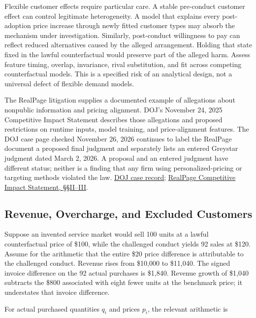 Flexible customer effects require particular care. A stable pre-conduct
customer effect can control legitimate heterogeneity. A model that
explains every post-adoption price increase through newly fitted
customer types may absorb the mechanism under investigation. Similarly,
post-conduct willingness to pay can reflect reduced alternatives caused
by the alleged arrangement. Holding that state fixed in the lawful
counterfactual would preserve part of the alleged harm. Assess feature
timing, overlap, invariance, rival substitution, and fit across
competing counterfactual models. This is a specified risk of an
analytical design, not a universal defect of flexible demand models.

The RealPage litigation supplies a documented example of allegations
about nonpublic information and pricing alignment. DOJ's November 24,
2025 Competitive Impact Statement describes those allegations and
proposed restrictions on runtime inputs, model training, and
price-alignment features. The DOJ case page checked November 26, 2026
continues to label the RealPage document a proposed final judgment and
separately lists an entered Greystar judgment dated March 2, 2026. A
proposal and an entered judgment have different status; neither is a
finding that any firm using personalized-pricing or targeting methods
violated the law.
\href{https://www.justice.gov/atr/case/us-and-plaintiff-states-v-realpage-inc}{DOJ
case record};
\href{https://www.justice.gov/atr/media/1419471/dl?inline=}{RealPage
Competitive Impact Statement, §§II--III}.

\hypertarget{M09-revenue-overcharge-and-excluded-customers}{%
\subsection{Revenue, Overcharge, and Excluded
Customers}\label{M09-revenue-overcharge-and-excluded-customers}}

\noindent \noindent Suppose an invented service market would sell 100 units at a
lawful counterfactual price of \$100, while the challenged conduct
yields 92 sales at \$120. Assume for the arithmetic that the entire \$20
price difference is attributable to the challenged conduct. Revenue
rises from \$10,000 to \$11,040. The signed invoice difference on the 92
actual purchases is \$1,840. Revenue growth of \$1,040 subtracts the
\$800 associated with eight fewer units at the benchmark price; it
understates that invoice difference.

For actual purchased quantities \(q_i\) and prices \(p_i\), the relevant
arithmetic is

